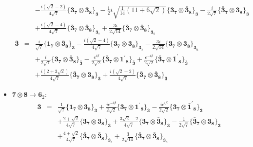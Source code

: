 \documentclass[english]{article}
\newcommand{\subcg}[3]{\big\{ {#1}\otimes{#2}\big\}^{}_{#3}}
\newcommand{\rep}[1]{\mathbf{#1}}
\begin{document}
\begin{itemize}
\begin{eqnarray*}
 & & -\frac{i \left(\sqrt{2}-2\right)}{4 \sqrt{7}}\subcg{\rep{3}_{\rep{7}}}{\rep{3}_{\rep{8}}}{\rep{3}}-\frac{1}{2} i \sqrt{\frac{1}{14} \left(11+6 \sqrt{2}\right)}\subcg{\rep{3}_{\rep{7}}}{\rep{\bar{3}}_{\rep{8}}}{\rep{3}}-\frac{i}{2 \sqrt{7}}\subcg{\rep{\bar{3}}_{\rep{7}}}{\rep{3}_{\rep{8}}}{\rep{3}} \\ 
 & & +\frac{i \left(\sqrt{2}-4\right)}{4 \sqrt{7}}\subcg{\rep{\bar{3}}_{\rep{7}}}{\rep{\bar{3}}_{\rep{8}}}{\rep{3}_{s}}+\frac{3 i}{2 \sqrt{14}}\subcg{\rep{\bar{3}}_{\rep{7}}}{\rep{\bar{3}}_{\rep{8}}}{\rep{3}_{a}}
\\
\rep{\bar{3}} &=& \frac{i}{\sqrt{7}}\subcg{\rep{1}_{\rep{7}}}{\rep{\bar{3}}_{\rep{8}}}{\rep{\bar{3}}}-\frac{i \left(\sqrt{2}-4\right)}{4 \sqrt{7}}\subcg{\rep{3}_{\rep{7}}}{\rep{3}_{\rep{8}}}{\rep{\bar{3}}_{s}}-\frac{3 i}{2 \sqrt{14}}\subcg{\rep{3}_{\rep{7}}}{\rep{3}_{\rep{8}}}{\rep{\bar{3}}_{a}} \\ 
 & & +\frac{i}{2 \sqrt{7}}\subcg{\rep{3}_{\rep{7}}}{\rep{\bar{3}}_{\rep{8}}}{\rep{\bar{3}}}-\frac{e^{i \beta }}{2 \sqrt{2}}\subcg{\rep{\bar{3}}_{\rep{7}}}{\rep{1^{\prime}}_{\rep{8}}}{\rep{\bar{3}}}+\frac{e^{-i \beta }}{2 \sqrt{2}}\subcg{\rep{\bar{3}}_{\rep{7}}}{\rep{\bar{1}^{\prime}}_{\rep{8}}}{\rep{\bar{3}}} \\ 
 & & +\frac{i \left(2+3 \sqrt{2}\right)}{4 \sqrt{7}}\subcg{\rep{\bar{3}}_{\rep{7}}}{\rep{3}_{\rep{8}}}{\rep{\bar{3}}}+\frac{i \left(\sqrt{2}-2\right)}{4 \sqrt{7}}\subcg{\rep{\bar{3}}_{\rep{7}}}{\rep{\bar{3}}_{\rep{8}}}{\rep{\bar{3}}}
\end{eqnarray*}
\item $\rep{7}\otimes\rep{8}\to\rep{6}_{2}$:
\begin{eqnarray*}
\rep{3} &=& \frac{1}{\sqrt{7}}\subcg{\rep{1}_{\rep{7}}}{\rep{3}_{\rep{8}}}{\rep{3}}+\frac{i e^{-i \beta }}{2 \sqrt{2}}\subcg{\rep{3}_{\rep{7}}}{\rep{1^{\prime}}_{\rep{8}}}{\rep{3}}-\frac{i e^{i \beta }}{2 \sqrt{2}}\subcg{\rep{3}_{\rep{7}}}{\rep{\bar{1}^{\prime}}_{\rep{8}}}{\rep{3}} \\ 
 & & +\frac{2+\sqrt{2}}{4 \sqrt{7}}\subcg{\rep{3}_{\rep{7}}}{\rep{3}_{\rep{8}}}{\rep{3}}+\frac{3 \sqrt{2}-2}{4 \sqrt{7}}\subcg{\rep{3}_{\rep{7}}}{\rep{\bar{3}}_{\rep{8}}}{\rep{3}}-\frac{1}{2 \sqrt{7}}\subcg{\rep{\bar{3}}_{\rep{7}}}{\rep{3}_{\rep{8}}}{\rep{3}} \\ 
 & & +\frac{4+\sqrt{2}}{4 \sqrt{7}}\subcg{\rep{\bar{3}}_{\rep{7}}}{\rep{\bar{3}}_{\rep{8}}}{\rep{3}_{s}}+\frac{3}{2 \sqrt{14}}\subcg{\rep{\bar{3}}_{\rep{7}}}{\rep{\bar{3}}_{\rep{8}}}{\rep{3}_{a}}
\\

\end{eqnarray*}
\end{itemize}
\end{document}
